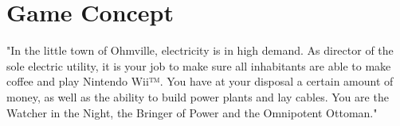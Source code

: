 \chapter{Game Concept}

	"In the little town of Ohmville, electricity is in high demand. As director of the sole electric 
	utility, it is your job to make sure all inhabitants are able to make coffee and play Nintendo Wii™. 
	You have at your disposal a certain amount of money, as well as the ability to build power plants 
	and lay cables. You are the Watcher in the Night, the Bringer of Power and the Omnipotent Ottoman."


